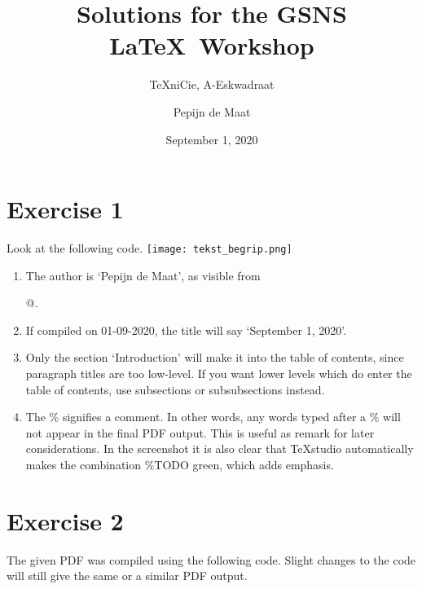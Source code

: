 \documentclass{article}
\title{Solutions for the GSNS \LaTeX\ Workshop}
\author{\TeX niCie, A-Eskwadraat}
\date{September 1, 2020}
\begin{document}
\maketitle
\tableofcontents


\clearpage 

\section{Exercise 1} 

Look at the following code.\bigbreak
\texttt{[image: tekst\_begrip.png]}

\begin{enumerate}
	\item The author is `Pepijn de Maat', as visible from \verb@\author{Pepijn de Maat}@.
	\item If compiled on 01-09-2020, the title will say `September 1, 2020'.
	\item Only the section `Introduction' will make it into the table of contents, since paragraph titles are too low-level. If you want lower levels which do enter the table of contents, use subsections or subsubsections instead.
	\item The \% signifies a comment. In other words, any words typed after a \% will not appear in the final PDF output. This is useful as remark for later considerations. In the screenshot it is also clear that TeXstudio automatically makes the combination \%TODO green, which adds emphasis.
\end{enumerate}

\clearpage

\section{Exercise 2}
The given PDF was compiled using the following code. Slight changes to the code will still give the same or a similar PDF output.
\end{document}
